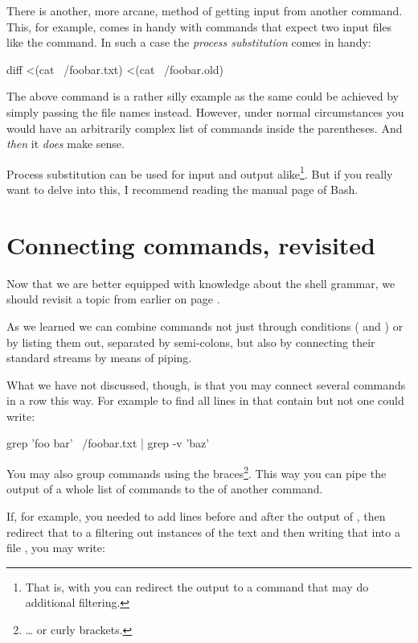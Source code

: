 \documentclass{olli-handout}
\begin{document}
There is another, more arcane, method of getting input from another command. This, for example, comes in handy with commands that expect two input files like the  command. In such a case the \emph{process substitution} comes in handy:

\begin{lstbash}
diff <(cat ~/foobar.txt) <(cat ~/foobar.old)
\end{lstbash}

The above command is a rather silly example as the same could be achieved by simply passing the file names instead. However, under normal circumstances you would have an arbitrarily complex list of commands inside the parentheses. And \emph{then} it \emph{does} make sense.

Process substitution can be used for input and output alike\footnote{That is, with  you can redirect the output to a command that may do additional filtering.}. But if you really want to delve into this, I recommend reading the manual page of Bash.

\section{Connecting commands, revisited}

Now that we are better equipped with knowledge about the shell grammar, we should revisit a topic from earlier on page \pageref{cmd_combos}.

As we learned we can combine commands not just through conditions (\TTQ{\&\&} and \TTQ{\textbar\textbar}) or by listing them out, separated by semi-colons, but also by connecting their standard streams by means of piping.

What we have not discussed, though, is that you may connect several commands in a row this way. For example to find all lines in  that contain  but not  one could write:

\begin{lstbash}
grep 'foo bar' ~/foobar.txt | grep -v 'baz'
\end{lstbash}

You may also group commands using the braces\footnote{\ldots{} or curly brackets.}. This way you can pipe the output of a whole list of commands to the  of another command.

If, for example, you needed to add lines before and after the output of , then redirect that to a  filtering out instances of the text  and then writing that into a file , you may write:
\end{document}
